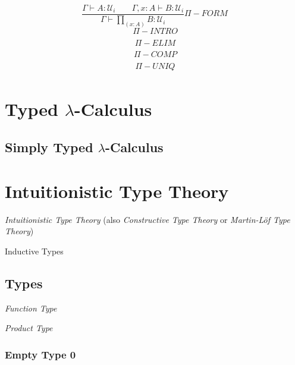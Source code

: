 \documentclass{article}
\begin{document}
\[
    {
        \frac
        {\Gamma \vdash A : \mathcal{U}_i \;\;\;\;\;\;\;
        \Gamma,x:A \vdash B : \mathcal{U}_i}
        {\Gamma \vdash \prod_{(x:A)} B : \mathcal{U}_i}
    } \Pi-FORM
\]\[
    {
        \frac
        {}
        {}
    } \Pi-INTRO
\]\[
    {
        \frac
        {}
        {}
    } \Pi-ELIM
\]\[
    {
        \frac
        {}
        {}
    } \Pi-COMP
\]\[
    {
        \frac
        {}
        {}
    } \Pi-UNIQ
\]



\section{Typed $\lambda$-Calculus}\label{sec:typed_lambda_calculus}

\subsection{Simply Typed $\lambda$-Calculus}\label{subsec:simply_typed}



\section{Intuitionistic Type Theory}

\emph{Intuitionistic Type Theory} (also \emph{Constructive Type
  Theory} or \emph{Martin-L\"of Type Theory})

Inductive Types



\subsection{Types}

\emph{Function Type}

\emph{Product Type}

\subsubsection{Empty Type $\mathbf{0}$}
\end{document}
